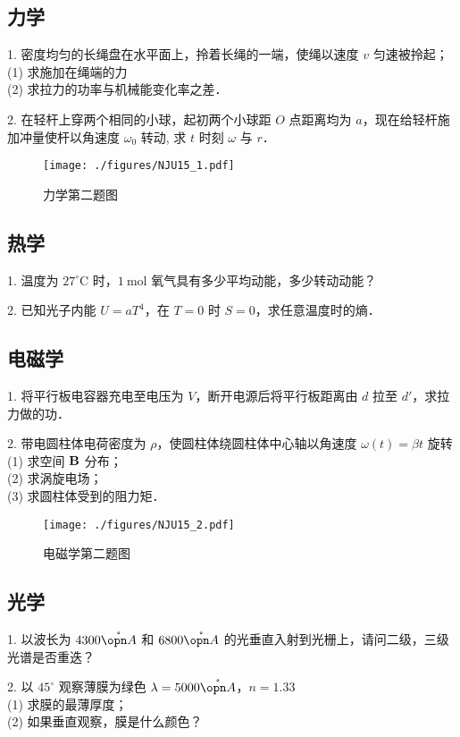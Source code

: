 \subsection{力学}
1. 密度均匀的长绳盘在水平面上，拎着长绳的一端，使绳以速度 $v$ 匀速被拎起；\\
(1) 求施加在绳端的力\\
(2) 求拉力的功率与机械能变化率之差．

2. 在轻杆上穿两个相同的小球，起初两个小球距 $O$ 点距离均为 $a$，现在给轻杆施加冲量使杆以角速度 $\omega_{0}$ 转动, 求 $t$ 时刻 $\omega$ 与 $r$．
\begin{figure}[ht]
\centering
\texttt{[image: ./figures/NJU15\_1.pdf]}
\caption{力学第二题图} \label{NJU15_fig1}
\end{figure}
\subsection{热学}
1. 温度为 $27^{\circ} \mathrm{C}$ 时，$1 \mathrm{~mol}$ 氧气具有多少平均动能，多少转动动能？

2. 已知光子内能 $U=a T^{4}$，在 $T=0$ 时 $S=0$，求任意温度时的熵．
\subsection{电磁学}
1. 将平行板电容器充电至电压为 $V$，断开电源后将平行板距离由 $d$ 拉至 $d'$，求拉力做的功．

2. 带电圆柱体电荷密度为 $\rho$，使圆柱体绕圆柱体中心轴以角速度 $\omega(t)=\beta t$ 旋转\\
(1) 求空间 $\bf{B}$ 分布；\\
(2) 求涡旋电场；\\
(3) 求圆柱体受到的阻力矩．
\begin{figure}[ht]
\centering
\texttt{[image: ./figures/NJU15\_2.pdf]}
\caption{电磁学第二题图} \label{NJU15_fig2}
\end{figure}
\subsection{光学}
1. 以波长为 $4300 \mathring{\opn A}$ 和 $6800 \mathring{\opn A}$ 的光垂直入射到光栅上，请问二级，三级光谱是否重迭？

2. 以 $45^{\circ}$ 观察薄膜为绿色 $\lambda=5000 \mathring{\opn A}$，$n=1.33$\\
(1) 求膜的最薄厚度；\\
(2) 如果垂直观察，膜是什么颜色？